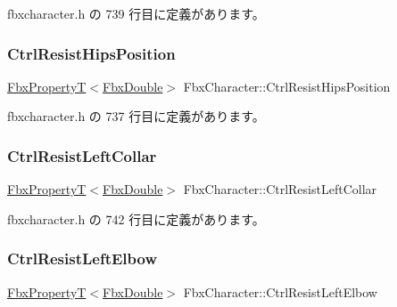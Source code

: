  fbxcharacter.\+h の 739 行目に定義があります。

\mbox{\label{class_fbx_character_a9df873c898296109d772b66c495158f2}} 
\subsubsection{\texorpdfstring{Ctrl\+Resist\+Hips\+Position}{CtrlResistHipsPosition}}
{\footnotesize\ttfamily \hyperlink{class_fbx_property_t}{Fbx\+PropertyT}$<$\hyperlink{fbxtypes_8h_a171e72a1c46fc15c1a6c9c31948c1c5b}{Fbx\+Double}$>$ Fbx\+Character\+::\+Ctrl\+Resist\+Hips\+Position}



 fbxcharacter.\+h の 737 行目に定義があります。

\mbox{\label{class_fbx_character_a1fb34d9229828d20770e3cc633bb1c55}} 
\subsubsection{\texorpdfstring{Ctrl\+Resist\+Left\+Collar}{CtrlResistLeftCollar}}
{\footnotesize\ttfamily \hyperlink{class_fbx_property_t}{Fbx\+PropertyT}$<$\hyperlink{fbxtypes_8h_a171e72a1c46fc15c1a6c9c31948c1c5b}{Fbx\+Double}$>$ Fbx\+Character\+::\+Ctrl\+Resist\+Left\+Collar}



 fbxcharacter.\+h の 742 行目に定義があります。

\mbox{\label{class_fbx_character_a458ef1c6f23727b7bc6e7c5458cc5cfd}} 
\subsubsection{\texorpdfstring{Ctrl\+Resist\+Left\+Elbow}{CtrlResistLeftElbow}}
{\footnotesize\ttfamily \hyperlink{class_fbx_property_t}{Fbx\+PropertyT}$<$\hyperlink{fbxtypes_8h_a171e72a1c46fc15c1a6c9c31948c1c5b}{Fbx\+Double}$>$ Fbx\+Character\+::\+Ctrl\+Resist\+Left\+Elbow}



